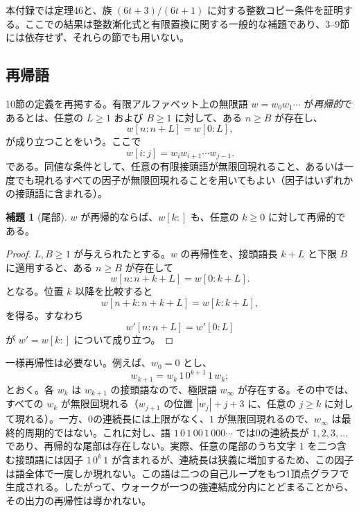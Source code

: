\documentclass[11pt,reqno]{amsart}
\theoremstyle{definition}
\newtheorem{lemma}[theorem]{補題}
\theoremstyle{definition}
\theoremstyle{remark}
\begin{document}
本付録では定理46と、族 \((6t+3)/(6t+1)\) に対する整数コピー条件を証明する。ここでの結果は整数漸化式と有限置換に関する一般的な補題であり、3--9節には依存せず、それらの節でも用いない。

\subsection{再帰語}\label{sec:B.1}

10節の定義を再掲する。有限アルファベット上の無限語 \(w=w_0w_1\cdots\) が\emph{再帰的}であるとは、任意の \(L\ge1\) および \(B\ge1\) に対して、ある \(n\ge B\) が存在し、
\[
w[n:n+L]=w[0:L],
\]
が成り立つことをいう。ここで
\[
w[i:j]=w_iw_{i+1}\cdots w_{j-1}.
\]
である。同値な条件として、任意の有限接頭語が無限回現れること、あるいは一度でも現れるすべての因子が無限回現れることを用いてもよい（因子はいずれかの接頭語に含まれる）。

\begin{samepage}
\begin{lemma}[尾部]\leavevmode\label{thm:48}
\(w\) が再帰的ならば、\(w[k:]\) も、任意の \(k\ge0\) に対して再帰的である。
\label{thm-end:48}
\end{lemma}
\end{samepage}

\begin{proof}\leavevmode\label{proof:48}
\(L,B\ge1\) が与えられたとする。\(w\) の再帰性を、接頭語長 \(k+L\) と下限 \(B\) に適用すると、ある \(n\ge B\) が存在して
\[
w[n:n+k+L]=w[0:k+L].
\]
となる。位置 \(k\) 以降を比較すると
\[
w[n+k:n+k+L]=w[k:k+L],
\]
を得る。すなわち
\[
w'[n:n+L]=w'[0:L]
\]
が
\(w'=w[k:]\)
について成り立つ。\qedhere
\end{proof}

一様再帰性は必要ない。例えば、\(w_0=0\) とし、
\[
w_{k+1}=w_k\,1\,0^{k+1}\,1\,w_k;
\]
とおく。各 \(w_k\) は \(w_{k+1}\) の接頭語なので、極限語 \(w_\infty\) が存在する。その中では、すべての \(w_k\) が無限回現れる（\(w_{j+1}\) の位置 \(|w_j|+j+3\) に、任意の \(j\ge k\) に対して現れる）。一方、0の連続長には上限がなく、\(1\) が無限回現れるので、\(w_\infty\) は最終的周期的ではない。これに対し、語 \(1\,0\,1\,00\,1\,000\cdots\) では0の連続長が \(1,2,3,\ldots\) であり、再帰的な尾部は存在しない。実際、任意の尾部のうち文字 \(1\) を二つ含む接頭語には因子 \(1\,0^k\,1\) が含まれるが、連続長は狭義に増加するため、この因子は語全体で一度しか現れない。この語は二つの自己ループをもつ1頂点グラフで生成される。したがって、ウォークが一つの強連結成分内にとどまることから、その出力の再帰性は導かれない。
\end{document}
